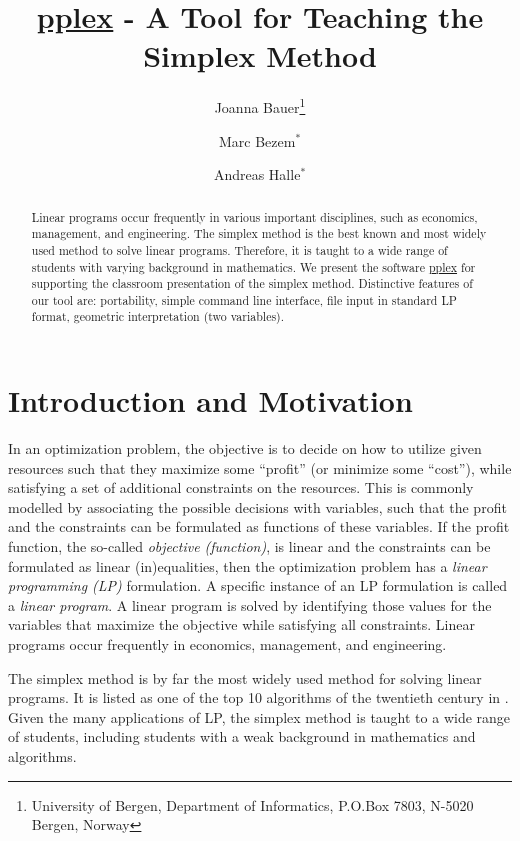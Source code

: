 \documentclass[ukenglish]{nik}
\begin{document}
\title{\url{pplex} - A Tool for Teaching the Simplex Method}

\author{
Joanna Bauer\thanks{University of Bergen, Department of Informatics, P.O.Box 7803, N-5020 Bergen, Norway}
\and
Marc Bezem$^*$
\and
Andreas Halle$^*$}

\maketitle

\begin{abstract}
Linear programs occur frequently in various important disciplines, such as economics, management, and engineering.
The simplex method is the best known and most widely used method to solve linear programs.
Therefore, it is taught to a wide range of students with varying background in mathematics.
We present the software \url{pplex} for supporting
the classroom presentation of the simplex method.
Distinctive features of our tool are: 
portability, 
simple command line interface, 
file input in standard LP format,
geometric interpretation (two variables).
\end{abstract}

\section{Introduction and Motivation}\label{sec:intro}
In an optimization problem, the objective is to decide on how to utilize given resources such that they maximize some ``profit'' (or minimize some ``cost''), while satisfying a set of additional constraints on the resources.
This is commonly modelled by associating the possible decisions with variables, such that the profit and the constraints can be formulated as functions of these variables. 
If the profit function, the so-called \emph{objective (function)}, is linear and the constraints can be formulated as linear (in)equalities, then the optimization problem has a \emph{linear programming (LP)} formulation. A specific instance of an LP formulation is called a \emph{linear program}.
A linear program is solved by identifying those values for the variables that maximize the objective while satisfying all constraints.
Linear programs occur frequently in economics, management, and engineering.

The simplex method is by far the most widely used method for solving linear programs. 
It is listed as one of the top 10 algorithms of the twentieth century in
\cite{CiSaE2000}. Given the many applications of LP, the simplex method is taught to a wide range of
students, including students with a weak background in mathematics and algorithms. 
\end{document}
